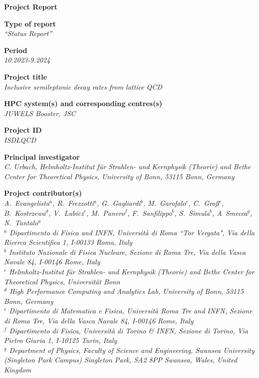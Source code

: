 \documentclass [a4paper, 11pt]{article}
\begin{document}
\LARGE
\begin{center}
	\bf Project Report\\
\end{center}

\large
\bigskip
\bigskip
\bigskip

\textbf{Type of report}\\
\phantom{MM}\textit{“Status Report”}

\bigskip
\textbf{Period}\\
\phantom{MM}\textit{10.2023-9.2024}

\bigskip
\textbf{Project title}\\
\phantom{MM}\textit{Inclusive semileptonic decay rates from lattice QCD}

\bigskip
\textbf{HPC system(s) and corresponding centres(s)}\\
\phantom{MM} \textit{JUWELS Booster, JSC}

\bigskip
\textbf{Project ID}\\
\phantom{MM} \textit{ISDLQCD}

\textbf{Principal investigator}\\
\phantom{MM} \textit{C. Urbach, Helmholtz-Institut für Strahlen- und Kernphysik (Theorie) and
	Bethe Center for Theoretical Physics, University of Bonn, 53115 Bonn, Germany}

\bigskip
\textbf{Project contributor(s)}\\

\phantom{MM} \textit{
	A.~Evangelista$^a$,
	R.~Frezzotti$^a$,
	G.~Gagliardi$^b$,
	M.~Garofalo$^c$,
	C.~Groß$^c$,
	B.~Kostrzewa$^d$,
	V.~Lubicz$^e$,
	M.~Panero$^f$,
	F.~Sanfilippo$^b$,
	S.~Simula$^b$,
	A~Smecca$^g$,
	N.~Tantalo$^a$
}\\


\textit{$^a$ Dipartimento di Fisica and INFN, Universit\`a di Roma ``Tor Vergata", Via della Ricerca Scientifica 1, I-00133 Roma, Italy}\\
\textit{$^b$ Instituto Nazionale di Fisica Nucleare, Sezione di Roma Tre, Via della Vasca Navale 84, I-00146 Rome, Italy }\\
\textit{$^c$ Helmholtz-Institut f{\"u}r Strahlen- und Kernphysik (Theorie) and Bethe Center for Theoretical Physics, Universit{\"a}t Bonn}\\
\textit{$^d$ High Performance Computing and Analytics Lab, University of Bonn, 53115 Bonn, Germany} \\
\textit{$^e$ Dipartimento di Matematica e Fisica, Universit\`a Roma Tre and INFN, Sezione di Roma Tre, Via della Vasca Navale 84, I-00146 Rome, Italy} \\
\textit{$^f$ Dipartimento di Fisica, Università di Torino \& INFN, Sezione di Torino, Via Pietro Giuria 1, I-10125 Turin, Italy}\\
\textit{$^g$ Department of Physics, Faculty of Science and Engineering, Swansea University (Singleton Park Campus) Singleton Park, SA2 8PP Swansea, Wales, United Kingdom}
\end{document}
